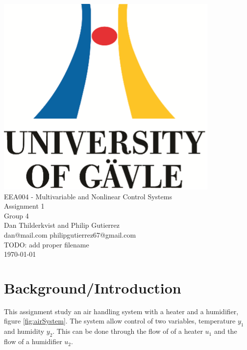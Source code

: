 \documentclass[a4paper, titlepage]{article}
\begin{document}
\begin{titlepage}
\begin{center}
\vspace*{1cm}
\includegraphics[scale=1.0]{../figures/hig_logo_eng.png}\\
\vspace{1.5cm}
\large EEA004 - Multivariable and Nonlinear Control Systems\\
\large Assignment 1\\
\vspace{1.5cm}
Group 4\\
Dan Thilderkvist and Philip Gutierrez\\
dan@mail.com philipgutierrez67@gmail.com\\
TODO: add proper filename\\
\vspace{1cm}
\today
\end{center}
\end{titlepage}



\section{Background/Introduction}
This assignment study an air handling system with a heater and a humidifier, figure \ref{fig:airSystem}.
The system allow control of two variables, temperature $y_1$ and humidity $y_2$.
This can be done through the flow of of a heater $u_1$ and the flow of a humidifier $u_2$.
\end{document}
